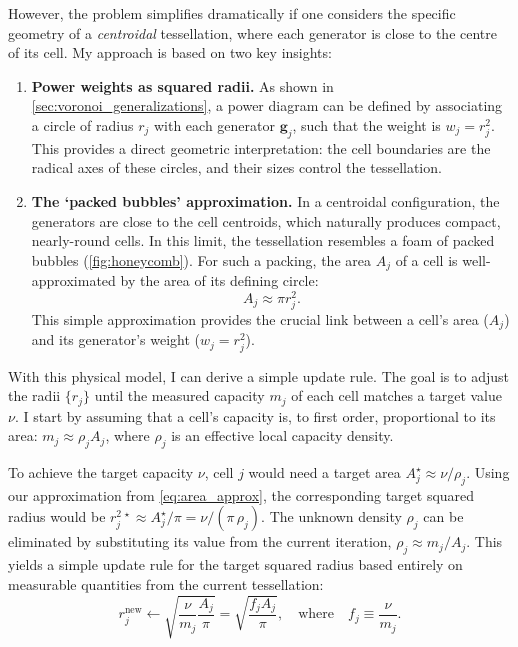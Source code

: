 \documentclass[fleqn,usenatbib]{mnras}
\begin{document}
However, the problem simplifies dramatically if one considers the specific geometry of a \emph{centroidal} tessellation, where each generator is close to the centre of its cell. My approach is based on two key insights:
\begin{enumerate}
    \item \textbf{Power weights as squared radii.} As shown in \autoref{sec:voronoi_generalizations}, a power diagram can be defined by associating a circle of radius $r_j$ with each generator $\mathbf{g}_j$, such that the weight is $w_j = r_j^2$. This provides a direct geometric interpretation: the cell boundaries are the radical axes of these circles, and their sizes control the tessellation.

    \item \textbf{The `packed bubbles' approximation.} In a centroidal configuration, the generators are close to the cell centroids, which naturally produces compact, nearly-round cells. In this limit, the tessellation resembles a foam of packed bubbles (\autoref{fig:honeycomb}). For such a packing, the area $A_j$ of a cell is well-approximated by the area of its defining circle:
    \begin{equation}
        A_j \approx \pi r_j^2.
        \label{eq:area_approx}
    \end{equation}
    This simple approximation provides the crucial link between a cell's area ($A_j$) and its generator's weight ($w_j = r_j^2$).
\end{enumerate}

With this physical model, I can derive a simple update rule. The goal is to adjust the radii $\{r_j\}$ until the measured capacity $m_j$ of each cell matches a target value $\nu$. I start by assuming that a cell's capacity is, to first order, proportional to its area: $m_j \approx \rho_j A_j$, where $\rho_j$ is an effective local capacity density.

To achieve the target capacity $\nu$, cell $j$ would need a target area $A_j^{\star} \approx \nu / \rho_j$. Using our approximation from \autoref{eq:area_approx}, the corresponding target squared radius would be $r_j^{2\,\star} \approx A_j^{\star}/\pi = \nu/(\pi\,\rho_j)$. The unknown density $\rho_j$ can be eliminated by substituting its value from the current iteration, $\rho_j \approx m_j/A_j$. This yields a simple update rule for the target squared radius based entirely on measurable quantities from the current tessellation:
\begin{equation}
r_j^{\text{new}} \leftarrow \sqrt{\frac{\nu}{m_j} \frac{A_j}{\pi}} = \sqrt{\frac{f_j A_j}{\pi}}, \quad \text{where} \quad f_j \equiv \frac{\nu}{m_j}.
\label{eq:multiplicative_rule}
\end{equation}
\end{document}
